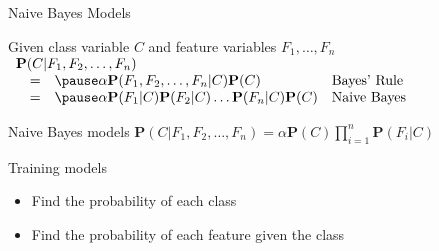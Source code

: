 \documentclass[12pt]{beamer}
\begin{document}
\begin{frame}{Naive Bayes Models}
	\begin{block}{Given class variable $C$ and feature variables $F_1,\ldots,F_n$}
		$
		\begin{array}{llll}
			\lefteqn{\mathbf{P}(C|F_1,F_2,\ldots,F_n)} \\
			& = & \pause\alpha\mathbf{P}(F_1,F_2,\ldots,F_n|C)\mathbf{P}(C) & \mbox{Bayes' Rule} \\
			& = & \pause\alpha\mathbf{P}(F_1|C)\mathbf{P}(F_2|C)\ldots\mathbf{P}(F_n|C)\mathbf{P}(C) & \mbox{Naive Bayes}
		\end{array}
		$
	\end{block}
	\pause
	\vspace{-1pt}
	\begin{block}{Naive Bayes models}
		$\mathbf{P}(C|F_1,F_2,\ldots,F_n) = \alpha\mathbf{P}(C)\prod\limits_{i=1}^{n}\mathbf{P}(F_{i}|C)$
	\end{block}
	\pause
	\vspace{-1pt}
	\begin{block}{Training models}
		\begin{itemize}
			\item Find the probability of each class
			\item Find the probability of each feature given the class
		\end{itemize}
	\end{block}
\end{frame}
\end{document}
